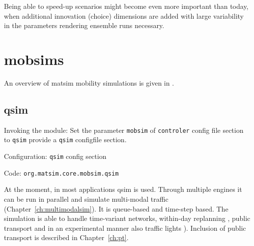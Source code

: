 Being able to speed-up scenarios might become even more important than today, when additional innovation (choice) dimensions are added with large variability in the parameters rendering ensemble runs necessary. %


\section{\protect\glspl{mobsim}}
\label{sec:mobsims}
An overview of \gls{matsim} mobility simulations is given in \citet[][]{Dobler_TechRep_IVT_2011}. %

\subsection{\protect\gls{qsim}}
\label{sec:qsim}
\begin{compactitem}
\item Invoking the module: Set the parameter \lstinline|mobsim| of \lstinline|controler| config file section to \lstinline|qsim| provide a \lstinline|qsim| \gls{configfile} section.
\item Configuration: \lstinline|qsim| config section
\item Code: \lstinline|org.matsim.core.mobsim.qsim|
\end{compactitem}

At the moment, in most applications \gls{qsim} \citep[][]{Dobler_TechRep_IVT_2011, Dobler_STRC_2010} is used. 
Through multiple engines it can be run in parallel and simulate multi-modal traffic (Chapter~\ref{ch:multimodalsim}). It is queue-based and time-step based. The simulation is able to handle time-variant networks, within-day replanning \citep[][]{Dobler_TechRep_IVT_2009}, public transport \citep[][]{Rieser_PhDThesis_2010} and in an experimental manner also traffic lights \citep[][]{Neumann_MastersThesis_2008}). Inclusion of public transport is described in Chapter~\ref{ch:pt}.

